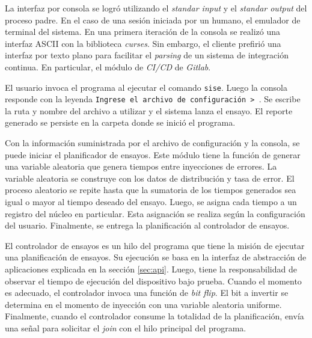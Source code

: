 
La interfaz por consola se logró utilizando el \emph{standar input} y el \emph{standar output} del proceso padre.
En el caso de una sesión iniciada por un humano, el emulador de terminal del sistema.
En una primera iteración de la consola se realizó una interfaz ASCII con la biblioteca \emph{curses}.
Sin embargo, el cliente prefirió una interfaz por texto plano para facilitar el \emph{parsing} de un sistema de integración continua.
En particular, el módulo de \emph{CI/CD} de \emph{Gitlab}.

El usuario invoca el programa al ejecutar el comando \texttt{sise}.
Luego la consola responde con la leyenda \texttt{Ingrese el archivo de configuración > }.
Se escribe la ruta y nombre del archivo a utilizar y el sistema lanza el ensayo.
El reporte generado se persiste en la carpeta donde se inició el programa.


Con la información suministrada por el archivo de configuración y la consola, se puede iniciar el planificador de ensayos.
Este módulo tiene la función de generar una variable aleatoria que genera tiempos entre inyecciones de errores.
La variable aleatoria se construye con los datos de distribución y tasa de error.
El proceso aleatorio se repite hasta que la sumatoria de los tiempos generados sea igual o mayor al tiempo deseado del ensayo.
Luego, se asigna cada tiempo a un registro del núcleo en particular.
Esta asignación se realiza según la configuración del usuario.
Finalmente, se entrega la planificación al controlador de ensayos.


El controlador de ensayos es un hilo del programa que tiene la misión de ejecutar una planificación de ensayos.
Su ejecución se basa en la interfaz de abstracción de aplicaciones explicada en la sección \ref{sec:api}.
Luego, tiene la responsabilidad de observar el tiempo de ejecución del dispositivo bajo prueba.
Cuando el momento es adecuado, el controlador invoca una función de \emph{bit flip}.
El bit a invertir se determina en el momento de inyección con una variable aleatoria uniforme.
Finalmente, cuando el controlador consume la totalidad de la planificación, envía una señal para solicitar el \emph{join} con el hilo principal del programa.


